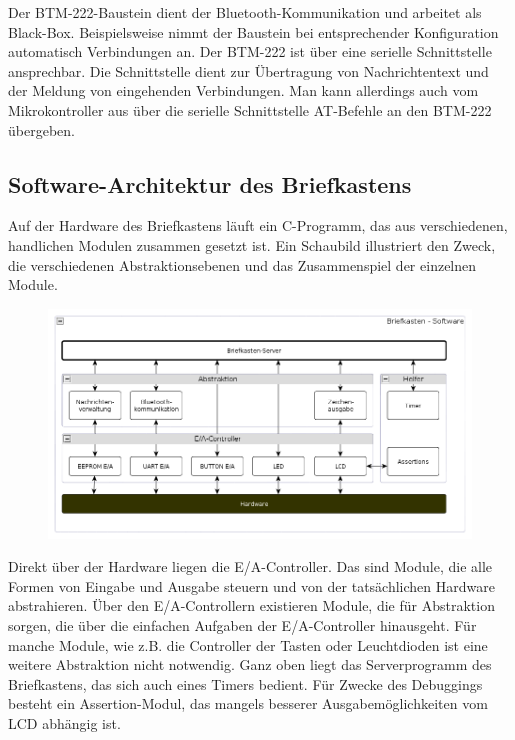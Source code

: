 \documentclass[ngerman]{article}
\begin{document}
Der BTM-222-Baustein dient der Bluetooth-Kommunikation und arbeitet als Black-Box.
Beispielsweise nimmt der Baustein bei entsprechender Konfiguration automatisch
Verbindungen an. Der BTM-222 ist über eine serielle Schnittstelle ansprechbar.
Die Schnittstelle dient zur Übertragung von Nachrichtentext und
der Meldung von eingehenden Verbindungen. Man kann allerdings auch vom
Mikrokontroller aus über die serielle Schnittstelle AT-Befehle an den
BTM-222 übergeben.

\subsection{Software-Architektur des Briefkastens}

Auf der Hardware des Briefkastens läuft ein C-Programm, das aus verschiedenen,
handlichen Modulen zusammen gesetzt ist. Ein Schaubild illustriert den Zweck,
die verschiedenen Abstraktionsebenen und das Zusammenspiel der einzelnen
Module.

\begin{figure}[h!] \begin{center}
    \includegraphics[width=\textwidth]{media/letterbox-arch}
\end{center} \end{figure}

Direkt über der Hardware liegen die E/A-Controller. Das sind Module, die alle
Formen von Eingabe und Ausgabe steuern und von der tatsächlichen Hardware
abstrahieren. Über den E/A-Controllern existieren Module, die für Abstraktion
sorgen, die über die einfachen Aufgaben der E/A-Controller hinausgeht. Für
manche Module, wie z.B. die Controller der Tasten oder Leuchtdioden ist eine
weitere Abstraktion nicht notwendig. Ganz oben liegt das Serverprogramm des
Briefkastens, das sich auch eines Timers bedient. Für Zwecke des Debuggings
besteht ein Assertion-Modul, das mangels besserer Ausgabemöglichkeiten vom LCD
abhängig ist.
\end{document}
